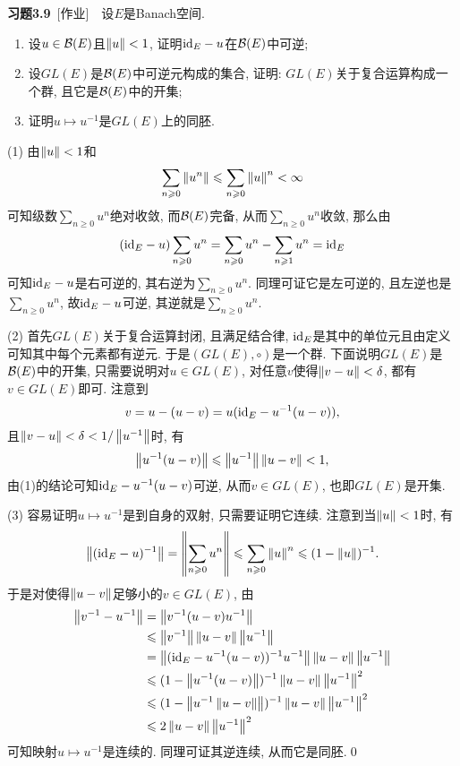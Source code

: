	\textbf{习题3.9}\ [作业]\ \ 设$ E $是Banach空间.
	\begin{enumerate}[(1)]
	\item 设$ u\in\mathcal{B}(E) $且$ \left\| u \right\|<1 $, 证明$ \mathrm{id}_E-u $在$ \mathcal{B}(E) $中可逆;
	\item 设$ GL(E) $是$ \mathcal{B}(E) $中可逆元构成的集合, 证明: $ GL(E) $关于复合运算构成一个群, 且它是$ \mathcal{B}(E) $中的开集;
	\item 证明$ u\mapsto u^{-1} $是$ GL(E) $上的同胚.
	\end{enumerate}
	
	\begin{Proof}
	(1) 由$ \left\| u \right\|<1 $和
	\[
	\sum_{n\geqslant 0}\left\| u^n \right\|\leqslant\sum_{n\geqslant 0}\left\| u \right\|^n<\infty
	\]
	可知级数$ \sum\limits_{n\geqslant 0}u^n $绝对收敛, 而$ \mathcal{B}(E) $完备, 从而$ \sum\limits_{n\geqslant 0}u^n $收敛, 那么由
	\[
	(\mathrm{id}_E-u)\sum_{n\geqslant 0}u^n=\sum_{n\geqslant 0}u^n-\sum_{n\geqslant 1}u^n=\mathrm{id}_E
	\]
	可知$ \mathrm{id}_E-u $是右可逆的, 其右逆为$ \sum\limits_{n\geqslant 0}u^n $. 同理可证它是左可逆的, 且左逆也是$ \sum\limits_{n\geqslant 0}u^n $, 故$ \mathrm{id}_E-u $可逆, 其逆就是$ \sum\limits_{n\geqslant 0}u^n $.
	
	(2) 首先$ GL(E) $关于复合运算封闭, 且满足结合律, $ \mathrm{id}_E $是其中的单位元且由定义可知其中每个元素都有逆元. 于是$ (GL(E),\circ) $是一个群. 下面说明$ GL(E) $是$ \mathcal{B}(E) $中的开集, 只需要说明对$ u\in GL(E) $, 对任意$ v $使得$ \left\| v-u \right\|<\delta $, 都有$ v\in GL(E) $即可. 注意到
	\[
	v=u-(u-v)=u(\mathrm{id}_E-u^{-1}(u-v)),
	\]
	且$ \left\| v-u \right\|<\delta<1/\left\| u^{-1} \right\| $时, 有
	\[
	\left\| u^{-1}(u-v) \right\|\leqslant \left\| u^{-1} \right\|\left\| u-v \right\|<1,
	\]
	由(1)的结论可知$ \mathrm{id}_E-u^{-1}(u-v) $可逆, 从而$ v\in GL(E) $, 也即$ GL(E) $是开集.
	
	(3) 容易证明$ u\mapsto u^{-1} $是到自身的双射, 只需要证明它连续. 注意到当$ \left\| u \right\|<1 $时, 有
	\[
	\left\| (\mathrm{id}_E-u)^{-1} \right\|=\left\| \sum_{n\geqslant 0}u^n \right\|\leqslant\sum_{n\geqslant 0}\left\| u \right\|^n\leqslant(1-\left\| u \right\|)^{-1}.
	\]
	于是对使得$ \left\| u-v \right\| $足够小的$ v\in GL(E) $, 由
	\begin{align*}
	\left\| v^{-1}-u^{-1} \right\|&=\left\| v^{-1}(u-v)u^{-1} \right\|\\
	&\leqslant\left\| v^{-1} \right\|\left\| u-v \right\|\left\| u^{-1} \right\|\\
	&=\left\| (\mathrm{id}_E-u^{-1}(u-v))^{-1}u^{-1} \right\|\left\| u-v \right\|\left\| u^{-1} \right\|\\
	&\leqslant(1-\left\| u^{-1}(u-v) \right\|)^{-1}\left\| u-v \right\|\left\| u^{-1} \right\|^2\\
	&\leqslant(1-\left\| u^{-1}\left\| u-v \right\| \right\|)^{-1}\left\| u-v \right\|\left\| u^{-1} \right\|^2\\
	&\leqslant 2\left\| u-v \right\|\left\| u^{-1} \right\|^2
	\end{align*}
	可知映射$ u\mapsto u^{-1} $是连续的. 同理可证其逆连续, 从而它是同胚.\qed
	\end{Proof}
	

